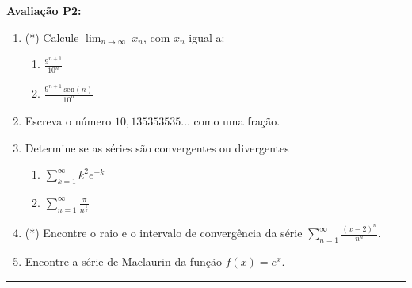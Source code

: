 \documentclass{article}
\newcommand{\ds}{\displaystyle}
\newcommand{\sen}{\mbox{sen}}
\begin{document}
{\bf Avalia\c{c}\~ao P2:}
\begin{enumerate}
\item (*) Calcule $\displaystyle\lim_{n\rightarrow\infty}\ x_n$, com $x_n$ igual a:
	\begin{enumerate}
		\item $\ds\frac{9^{n+1}}{10^n}$
		\item $\ds\frac{9^{n+1}\ \sen(n)}{10^n}$
	\end{enumerate}

\item Escreva o n\'umero $10,135353535\ldots$ como uma fra\c{c}\~ao.

\item Determine se as s\'eries s\~ao convergentes ou divergentes
	\begin{enumerate}
		\item $\ds\sum_{k=1}^\infty k^2 e^{-k}$
		\item $\ds\sum_{n=1}^\infty \frac{\pi}{n^{{\frac{1}{\pi}}}}$
	\end{enumerate}

\item (*) Encontre o raio e o intervalo de converg\^encia da s\'erie
$\ds\sum_{n=1}^\infty \frac{(x-2)^n}{n^n}$.

\item Encontre a s\'erie de Maclaurin da fun\c{c}\~ao $f(x) = e^x$.
\end{enumerate}
\noindent{}\rule{\textwidth}{0.4pt}
\end{document}
